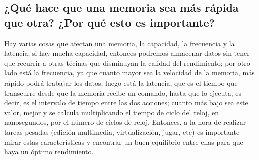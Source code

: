 \documentclass{article}
\begin{document}
\subsection{¿Qué hace que una memoria sea más rápida que otra? ¿Por qué esto es importante?}
Hay varias cosas que afectan una memoria, la capacidad, la frecuencia y la latencia; si hay mucha capacidad, entonces podremos almacenar datos sin tener que recurrir a otras técinas que disminuyan la calidad del rendimiento; por otro lado está la frecuencia, ya que cuanto mayor sea la velocidad de la memoria, más rápido podrá trabajar los datos; luego está la latencia, que es el tiempo que transcurre desde que la memoria recibe un comando, hasta que lo ejecuta, es decir, es el intervalo de tiempo entre las dos acciones; cuanto más bajo sea este valor, mejor y se calcula multiplicando el tiempo de ciclo del reloj, en nanosegundos, por el número de ciclos de reloj. Entonces, a la hora de realizar tareas pesadas (edición multimedia, virtualización, jugar, etc) es importante mirar estas características y encontrar un buen equilibrio entre ellas para que haya un óptimo rendimiento.
\cite{rendimiento}



\end{document}
